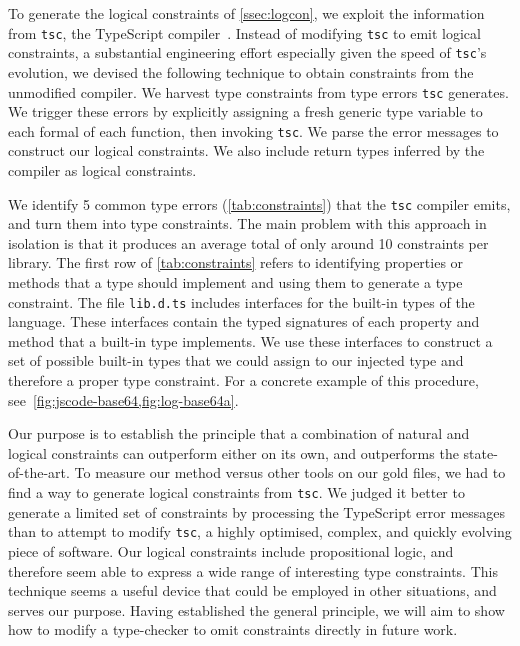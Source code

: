 \documentclass[acmsmall, review, anonymous]{acmart}\settopmatter{printfolios=true,printccs=false,printacmref=false}
\begin{document}
To generate the logical constraints of \cref{ssec:logcon}, we exploit the information from \lstinline+tsc+, the TypeScript compiler~\cite{typescript}.
%
Instead of modifying \lstinline+tsc+ to emit logical constraints, a substantial
engineering effort especially given the speed of \lstinline+tsc+'s evolution,
we devised the following technique to obtain constraints from the unmodified compiler.
%
We harvest type constraints from type errors \lstinline+tsc+ generates.  We trigger
these errors by explicitly assigning a fresh generic type variable to
each formal of each function, then invoking \lstinline+tsc+.
%
We parse the error messages to construct our logical constraints.
%
We also include return types inferred by the compiler as logical constraints.
%

We identify 5 common type errors (\cref{tab:constraints}) that the \texttt{tsc}
compiler emits, and turn them into type constraints. The main problem with
this approach in isolation is that it produces an average total
of only around 10 constraints per library. 
The first row of \cref{tab:constraints}
refers to identifying properties or methods that a type should implement
and using them to generate a type constraint.
The file \lstinline{lib.d.ts} includes interfaces for the built-in types of the language.
These interfaces contain the typed signatures of each property and method
that a built-in type implements. We use these interfaces to construct a set of
possible built-in types that we could assign to our injected type and therefore a proper
type constraint. For a concrete example of this procedure, 
see~\cref{fig:jscode-base64,fig:log-base64a}.


Our purpose is to establish the principle that a combination of natural and logical constraints can outperform either on its own, and outperforms the state-of-the-art.
%
To measure our method versus other tools on our gold files, we had to find a way to generate logical constraints from \lstinline+tsc+.
%
We judged it better to generate a limited set of constraints by processing the
TypeScript error messages than to attempt to modify \lstinline+tsc+, a highly optimised, complex, and quickly evolving piece of software.
%
Our logical constraints include propositional logic, and therefore seem able to express a wide range of interesting type constraints.
%
This technique seems a useful device that could be employed in other situations, and serves our purpose.
%
Having established the general principle, we will aim to show how to modify a type-checker to omit constraints directly in future work.
\end{document}
